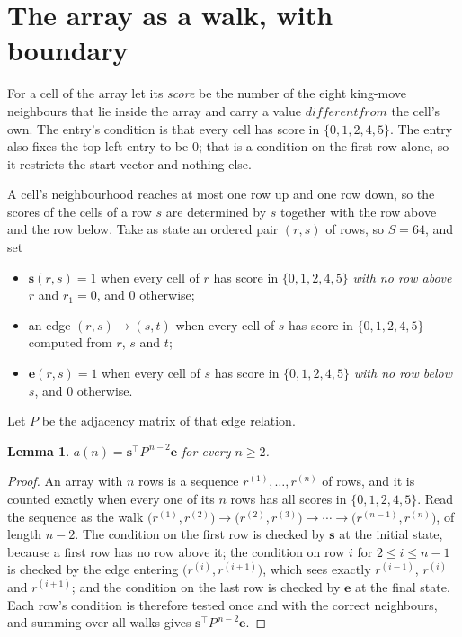 \documentclass[11pt,a4paper]{article}
\theoremstyle{plain}
\newtheorem{lemma}[theorem]{Lemma}
\theoremstyle{definition}
\begin{document}
\section{The array as a walk, with boundary}

For a cell of the array let its \emph{score} be the number of the eight king-move neighbours that lie inside
the array and carry a value $different from$ the cell's own. The entry's condition is that every cell
has score in $\{0,1,2,4,5\}$. The entry also fixes the top-left entry to be $0$; that is a condition on the first row alone, so it restricts the start vector and nothing else.

A cell's neighbourhood reaches at most one row up and one row down, so the scores of the
cells of a row $s$ are determined by $s$ together with the row above and the row below.
Take as state an ordered pair $(r,s)$ of rows, so $S=64$, and set
\begin{itemize}
\item $\mathbf{s}(r,s)=1$ when every cell of $r$ has score in $\{0,1,2,4,5\}$ \emph{with no row
above $r$} and $r_1=0$, and $0$ otherwise;
\item an edge $(r,s)\to(s,t)$ when every cell of $s$ has score in $\{0,1,2,4,5\}$ computed from
$r$, $s$ and $t$;
\item $\mathbf{e}(r,s)=1$ when every cell of $s$ has score in $\{0,1,2,4,5\}$ \emph{with no row
below $s$}, and $0$ otherwise.
\end{itemize}
Let $P$ be the adjacency matrix of that edge relation.

\begin{lemma}\label{lem:walk}
$a(n)=\mathbf{s}^{\!\top}P^{\,n-2}\mathbf{e}$ for every $n\ge2$.
\end{lemma}

\begin{proof}
An array with $n$ rows is a sequence $r^{(1)},\dots,r^{(n)}$ of rows, and it is counted
exactly when every one of its $n$ rows has all scores in $\{0,1,2,4,5\}$. Read the sequence as the
walk $\bigl(r^{(1)},r^{(2)}\bigr)\to\bigl(r^{(2)},r^{(3)}\bigr)\to\cdots\to
\bigl(r^{(n-1)},r^{(n)}\bigr)$, of length $n-2$. The condition on the first row is
checked by $\mathbf{s}$ at the initial state, because a first row has no row above it; the
condition on row $i$ for $2\le i\le n-1$ is checked by the edge entering
$\bigl(r^{(i)},r^{(i+1)}\bigr)$, which sees exactly $r^{(i-1)}$, $r^{(i)}$ and
$r^{(i+1)}$; and the condition on the last row is checked by $\mathbf{e}$ at the final
state. Each row's condition is therefore tested once and with the correct neighbours, and
summing over all walks gives $\mathbf{s}^{\!\top}P^{\,n-2}\mathbf{e}$.
\end{proof}
\end{document}
